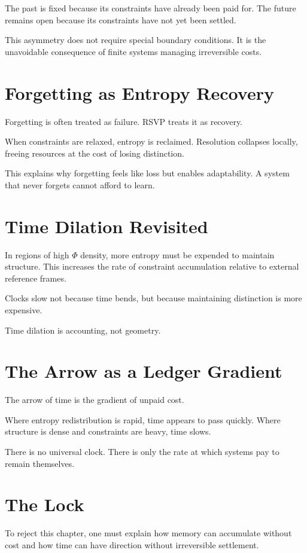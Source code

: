 \documentclass[11pt]{book}
\begin{document}
The past is fixed because its constraints have already been paid for. The future remains open because its constraints have not yet been settled.

This asymmetry does not require special boundary conditions. It is the unavoidable consequence of finite systems managing irreversible costs.

\section{Forgetting as Entropy Recovery}

Forgetting is often treated as failure. RSVP treats it as recovery.

When constraints are relaxed, entropy is reclaimed. Resolution collapses locally, freeing resources at the cost of losing distinction.

This explains why forgetting feels like loss but enables adaptability. A system that never forgets cannot afford to learn.

\section{Time Dilation Revisited}

In regions of high \(\Phi\) density, more entropy must be expended to maintain structure. This increases the rate of constraint accumulation relative to external reference frames.

Clocks slow not because time bends, but because maintaining distinction is more expensive.

Time dilation is accounting, not geometry.

\section{The Arrow as a Ledger Gradient}

The arrow of time is the gradient of unpaid cost.

Where entropy redistribution is rapid, time appears to pass quickly. Where structure is dense and constraints are heavy, time slows.

There is no universal clock. There is only the rate at which systems pay to remain themselves.

\section{The Lock}

To reject this chapter, one must explain how memory can accumulate without cost and how time can have direction without irreversible settlement.
\end{document}
